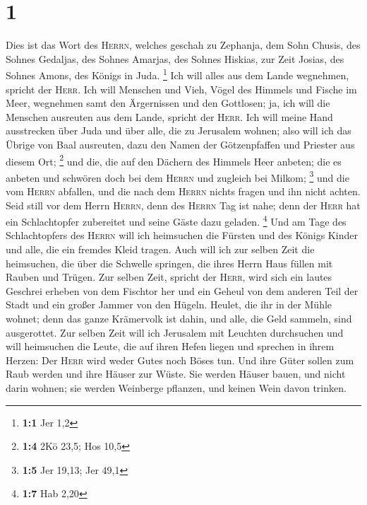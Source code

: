 \hypertarget{section}{%
\section{1}\label{section}}

 Dies ist das Wort des \textsc{Herrn}, welches geschah zu
Zephanja, dem Sohn Chusis, des Sohnes Gedaljas, des Sohnes Amarjas, des
Sohnes Hiskias, zur Zeit Josias, des Sohnes Amons, des Königs in Juda.
\footnote{\textbf{1:1} Jer 1,2}  Ich will alles aus dem
Lande wegnehmen, spricht der \textsc{Herr}.  Ich will
Menschen und Vieh, Vögel des Himmels und Fische im Meer, wegnehmen samt
den Ärgernissen und den Gottlosen; ja, ich will die Menschen ausreuten
aus dem Lande, spricht der \textsc{Herr}.  Ich will meine
Hand ausstrecken über Juda und über alle, die zu Jerusalem wohnen; also
will ich das Übrige von Baal ausreuten, dazu den Namen der Götzenpfaffen
und Priester aus diesem Ort; \footnote{\textbf{1:4} 2Kö 23,5; Hos 10,5}
 und die, die auf den Dächern des Himmels Heer anbeten;
die es anbeten und schwören doch bei dem \textsc{Herrn} und zugleich bei
Milkom; \footnote{\textbf{1:5} Jer 19,13; Jer 49,1}  und
die vom \textsc{Herrn} abfallen, und die nach dem \textsc{Herrn} nichts
fragen und ihn nicht achten.  Seid still vor dem Herrn
\textsc{Herrn}, denn des \textsc{Herrn} Tag ist nahe; denn der
\textsc{Herr} hat ein Schlachtopfer zubereitet und seine Gäste dazu
geladen. \footnote{\textbf{1:7} Hab 2,20}  Und am Tage des
Schlachtopfers des \textsc{Herrn} will ich heimsuchen die Fürsten und
des Königs Kinder und alle, die ein fremdes Kleid tragen. 
Auch will ich zur selben Zeit die heimsuchen, die über die Schwelle
springen, die ihres Herrn Haus füllen mit Rauben und Trügen.
 Zur selben Zeit, spricht der \textsc{Herr}, wird sich
ein lautes Geschrei erheben von dem Fischtor her und ein Geheul von dem
anderen Teil der Stadt und ein großer Jammer von den Hügeln.
 Heulet, die ihr in der Mühle wohnet; denn das ganze
Krämervolk ist dahin, und alle, die Geld sammeln, sind ausgerottet.
 Zur selben Zeit will ich Jerusalem mit Leuchten
durchsuchen und will heimsuchen die Leute, die auf ihren Hefen liegen
und sprechen in ihrem Herzen: Der \textsc{Herr} wird weder Gutes noch
Böses tun.  Und ihre Güter sollen zum Raub werden und
ihre Häuser zur Wüste. Sie werden Häuser bauen, und nicht darin wohnen;
sie werden Weinberge pflanzen, und keinen Wein davon trinken.
